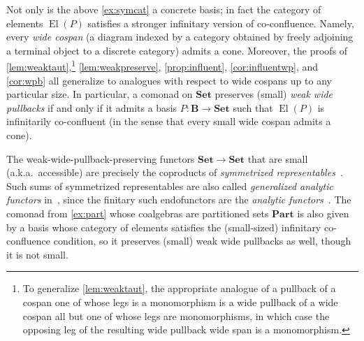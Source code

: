\documentclass[11pt, oneside, article]{memoir}
\theoremstyle{plain}
\theoremstyle{definition}
\theoremstyle{remark}
\newenvironment{example}
{\renewcommand\qedsymbol{$\lrcorner$}%
  \pushQED{\qed}\myexample}
{\popQED\endmyexample}
\newenvironment{remark}
{\renewcommand\qedsymbol{$\lrcorner$}%
  \pushQED{\qed}\myremark}
{\popQED\endmyremark}
\DeclareMathOperator{\id}{id}
\DeclareMathOperator{\El}{El}
\DeclareMathOperator\groth{\int\!}
\DeclarePairedDelimiter{\abs}{\lvert}{\rvert}
\newcommand{\namedcat}[1]{\mathbf{#1}}
\newcommand{\cat}[1]{\mathbf{#1}}
\newcommand{\Set}{\namedcat{Set}}
\newcommand{\Cat}{\namedcat{Cat}}
\newcommand{\Part}{\namedcat{Part}}
\newcommand{\pts}[1]{{\abs{#1}}}
\newcommand{\obs}[1]{\pts{#1}}
\newcommand{\ph}[1]{#1}
\newcommand{\bB}{\cat{B}}
\newcommand{\bC}{\cat{C}}
\newcommand{\bG}{\cat{G}}
\newcommand{\bJ}{\cat{J}}
\newcommand{\pP}{\ph{P}}
\begin{document}
\begin{remark}
  Not only is the above \cref{ex:symcat} a concrete basis; in fact the
  category of elements $\El(\pP)$ satisfies a stronger infinitary
  version of co-confluence. Namely, every \emph{wide cospan} (a
  diagram indexed by a category obtained by freely adjoining a
  terminal object to a discrete category) admits a cone. Moreover, the
  proofs of \cref{lem:weaktaut},\footnote{To generalize
    \cref{lem:weaktaut}, the appropriate analogue of a pullback of a
    cospan one of whose legs is a monomorphism is a wide pullback of a
    wide cospan all but one of whose legs are monomorphisms, in which
    case the opposing leg of the resulting wide pullback wide span is
    a monomorphism.}  \cref{lem:weakpreserve}, \cref{prop:influent},
  \cref{cor:influentwp}, and \cref{cor:wpb} all generalize to
  analogues with respect to wide cospans up to any particular size.
  In particular, a comonad on $\Set$ preserves (small) \emph{weak wide
    pullbacks} if and only if it admits a basis
  $\pP \colon \bB \to \Set$ such that $\El(\pP)$ is infinitarily
  co-confluent (in the sense that every small wide cospan admits a
  cone).

  The weak-wide-pullback-preserving functors $\Set \to \Set$ that are
  small (a.k.a.\ accessible) are precisely the coproducts of
  \emph{symmetrized representables}~\cite[Theorem
  3.3]{adamek-velebil}. Such sums of symmetrized representables are
  also called \emph{generalized analytic functors}
  in~\cite{pare:taut}, since the finitary such endofunctors are the
  \emph{analytic functors}~\cite{joyal:analytic}. The comonad from
  \cref{ex:part} whose coalgebras are partitioned sets $\Part$ is also
  given by a basis whose category of elements satisfies the
  (small-sized) infinitary co-confluence condition, so it preserves
  (small) weak wide pullbacks as well, though it is not small.
\end{remark}


\end{document}
